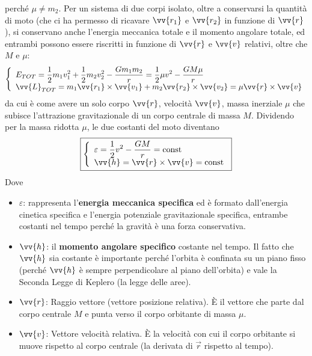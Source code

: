 \documentclass[a4paper, oneside]{book}
\begin{document}
perché $\mu \neq m_2$. 
Per un sistema di due corpi isolato, oltre a conservarsi la quantità di moto (che ci ha permesso di ricavare 
$\vv{r_1}$ e $\vv{r_2}$ in funzione di $\vv{r}$ ), si conservano anche l'energia meccanica
totale e il momento angolare totale, ed entrambi possono essere riscritti in funzione 
di $\vv{r}$ e $\vv{v}$ relativi, oltre che $M$ e $\mu$:
\begin{gather*}
    \left\{\begin{array}{l}
        \displaystyle E_{TOT} = \frac{1}{2}m_1 v_1^{2} + \frac{1}{2}m_2 v_2^{2} - \frac{Gm_1m_2}{r} = \frac{1}{2}\mu v^{2} - \frac{GM\mu}{r} \\
        \displaystyle \vv{L}_{TOT} = m_1 \vv{r_1} \times \vv{v_1} + m_2 \vv{r_2} \times \vv{v_2} = \mu \vv{r} \times \vv{v}       
    \end{array}\right.
\end{gather*}  
da cui è come avere un solo corpo $\vv{r}$, velocità $\vv{v}$, 
massa inerziale $\mu$ che subisce l'attrazione gravitazionale di un corpo centrale 
di massa $M$. Dividendo per la massa ridotta $\mu$, le due costanti 
del moto diventano 
\begin{align}
    \boxed{\left\{\begin{array}{l}
        \displaystyle \varepsilon = \frac{1}{2}v^{2} - \frac{GM}{r} = \text{const} \\
        \displaystyle \vv{h} = \vv{r} \times \vv{v} = \text{const}   
    \end{array}\right.}
\end{align}
Dove
\begin{itemize}
    \item $\varepsilon$: rappresenta l'\textbf{energia meccanica specifica} ed è formato 
    dall'energia cinetica specifica e l'energia potenziale gravitazionale specifica, 
    entrambe costanti nel tempo perché la gravità è una forza conservativa.
    \item $\vv{h}$: il \textbf{momento angolare specifico} costante nel tempo.
    Il fatto che $\vv{h}$ sia costante è importante perché l'orbita è confinata su un piano
    fisso (perché $\vv{h}$ è sempre perpendicolare al piano dell'orbita) e vale la Seconda
    Legge di Keplero (la legge delle aree).
    \item $\vv{r}$: Raggio vettore (vettore posizione relativa).
È il vettore che parte dal corpo centrale $M$ e punta verso il corpo orbitante di massa $\mu$.
\item $\vv{v}$: Vettore velocità relativa. È la velocità con cui il corpo orbitante si muove
rispetto al corpo centrale (la derivata di $\vec{r}$ rispetto al tempo).
\end{itemize}  
\end{document}
